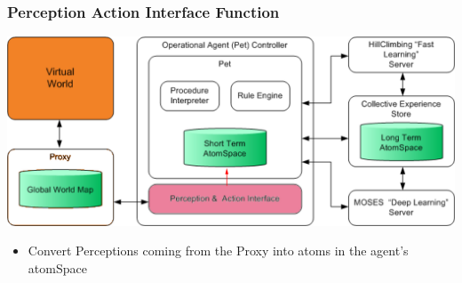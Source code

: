 \documentclass{beamer}
\begin{document}
\frame
{
  \frametitle{Perception Action Interface Function}

  \begin{center}
    \includegraphics[scale=0.1]{Embodiement_PAI_OPC.png}
  \end{center}
  
  \begin{itemize}
  \item<+-> Convert Perceptions coming from the Proxy into \alert{atoms
    in the agent's atomSpace}
  \end{itemize}

}
\end{document}
